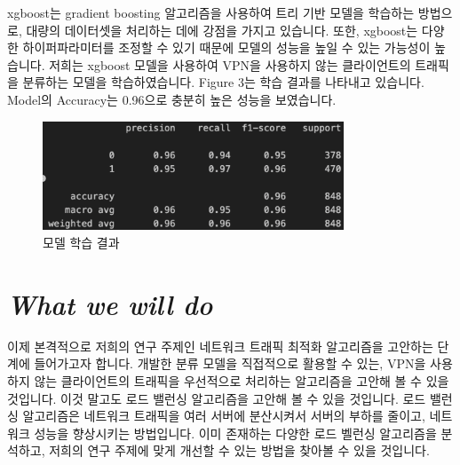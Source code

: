 \documentclass[14pt]{extarticle}
\begin{document}
xgboost는 gradient boosting 알고리즘을 사용하여 트리 기반 모델을 학습하는 방법으로, 대량의 데이터셋을 처리하는 데에 강점을 가지고 있습니다.
또한, xgboost는 다양한 하이퍼파라미터를 조정할 수 있기 때문에 모델의 성능을 높일 수 있는 가능성이 높습니다.
저희는 xgboost 모델을 사용하여 VPN을 사용하지 않는 클라이언트의 트래픽을 분류하는 모델을 학습하였습니다.
Figure 3는 학습 결과를 나타내고 있습니다. Model의 Accuracy는 0.96으로 충분히 높은 성능을 보였습니다.

\begin{figure}[h!]
    \centering
    \includegraphics[width=0.8\textwidth]{Photo_Result} %
    \caption{모델 학습 결과}
\end{figure}

\section{\textit{What we will do}}
이제 본격적으로 저희의 연구 주제인 네트워크 트래픽 최적화 알고리즘을 고안하는 단계에 들어가고자 합니다.
개발한 분류 모델을 직접적으로 활용할 수 있는, VPN을 사용하지 않는 클라이언트의 트래픽을 우선적으로 처리하는 알고리즘을 고안해 볼 수 있을 것입니다.
이것 말고도 로드 밸런싱 알고리즘을 고안해 볼 수 있을 것입니다.
로드 밸런싱 알고리즘은 네트워크 트래픽을 여러 서버에 분산시켜서 서버의 부하를 줄이고, 네트워크 성능을 향상시키는 방법입니다.
이미 존재하는 다양한 로드 벨런싱 알고리즘을 분석하고, 저희의 연구 주제에 맞게 개선할 수 있는 방법을 찾아볼 수 있을 것입니다.
\end{document}
